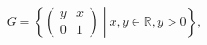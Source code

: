 $$G = \left\{ \left( \begin{matrix} y & x \\ 0 & 1  \end{matrix} \right) \middle| x,y \in \mathbb{R}, y>0 \right\},$$